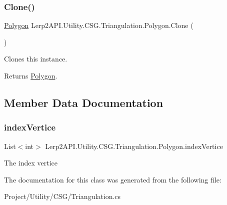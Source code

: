 \subsubsection{\texorpdfstring{Clone()}{Clone()}}
{\footnotesize\ttfamily \hyperlink{class_lerp2_a_p_i_1_1_utility_1_1_c_s_g_1_1_triangulation_1_1_polygon}{Polygon} Lerp2\+A\+P\+I.\+Utility.\+C\+S\+G.\+Triangulation.\+Polygon.\+Clone (\begin{DoxyParamCaption}{ }\end{DoxyParamCaption})\hspace{0.3cm}{\ttfamily [inline]}}



Clones this instance. 

\begin{DoxyReturn}{Returns}
\hyperlink{class_lerp2_a_p_i_1_1_utility_1_1_c_s_g_1_1_triangulation_1_1_polygon}{Polygon}.
\end{DoxyReturn}


\subsection{Member Data Documentation}
\mbox{\label{class_lerp2_a_p_i_1_1_utility_1_1_c_s_g_1_1_triangulation_1_1_polygon_aa4a42651f60f5ed96b7a9c2174efa73f}} 
\subsubsection{\texorpdfstring{index\+Vertice}{indexVertice}}
{\footnotesize\ttfamily List$<$int$>$ Lerp2\+A\+P\+I.\+Utility.\+C\+S\+G.\+Triangulation.\+Polygon.\+index\+Vertice}



The index vertice 



The documentation for this class was generated from the following file\+:\begin{DoxyCompactItemize}
\item 
Project/\+Utility/\+C\+S\+G/Triangulation.\+cs\end{DoxyCompactItemize}
